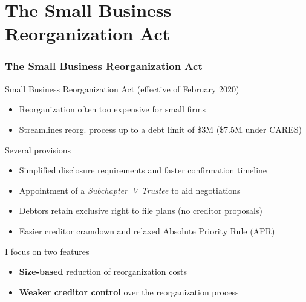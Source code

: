 \documentclass[aspectratio=169,xcolor=table]{beamer}
\begin{document}
\section{The Small Business \\ Reorganization Act}

\begin{frame}[label = SBRA]  \frametitle{The Small Business Reorganization Act \hfill \hyperlink{EU_reforms}{}}

Small Business Reorganization Act (effective of February 2020)
\begin{itemize} \small
    \item Reorganization often too expensive for small firms 
    \item Streamlines reorg. process up to a debt limit of \$3M  (\$7.5M under CARES) 
\end{itemize} \normalsize 

Several provisions 
\begin{itemize} \small
    \item Simplified disclosure requirements and faster confirmation timeline
    \item Appointment of a \textit{Subchapter~V Trustee} to aid negotiations
    \item Debtors retain exclusive right to file plans (no creditor proposals)
    \item Easier creditor cramdown and relaxed Absolute Priority Rule (APR)
\end{itemize} \normalsize 

I focus on two features
\begin{itemize} \small
    \item \textbf{Size-based} reduction of reorganization costs
    \item \textbf{Weaker creditor control} over the reorganization process
\end{itemize} \normalsize

\end{frame}
\end{document}
